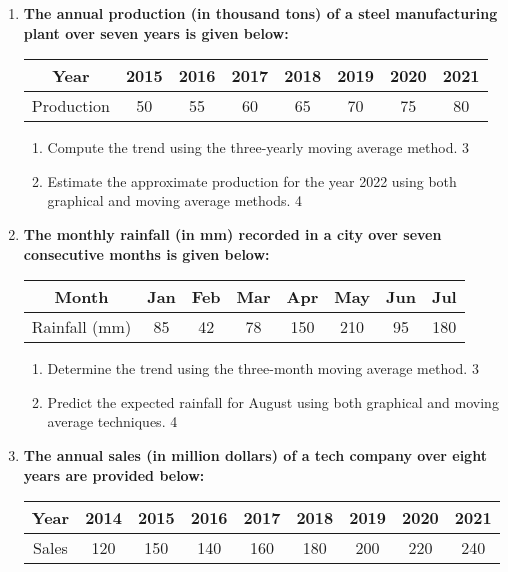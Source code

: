 \documentclass[a4paper,oneside]{book}
\begin{document}
\begin{enumerate}
  \item
\textbf{The annual production (in thousand tons) of a steel manufacturing plant over seven years is given below:}

\begin{table}[h]
\centering
\begin{tabular}{cccccccc}
Year     & 2015 & 2016 & 2017 & 2018 & 2019 & 2020 & 2021 \\ \hline
Production & 50   & 55   & 60   & 65   & 70   & 75   & 80   
\end{tabular}
\end{table}

\begin{enumerate}
    \item  
    Compute the trend using the three-yearly moving average method. \hfill 3
    \item
    Estimate the approximate production for the year 2022 using both graphical and moving average methods. \hfill 4
\end{enumerate}

\item  
\textbf{The monthly rainfall (in mm) recorded in a city over seven consecutive months is given below:}  

\begin{table}[h]  
\centering  
\begin{tabular}{cccccccc}  
Month     & Jan  & Feb  & Mar  & Apr  & May  & Jun  & Jul  \\ \hline  
Rainfall (mm) & 85   & 42   & 78   & 150  & 210  & 95   & 180    
\end{tabular}  
\end{table}  

\begin{enumerate}  
    \item  
    Determine the trend using the three-month moving average method. \hfill 3  
    \item  
    Predict the expected rainfall for August using both graphical and moving average techniques. \hfill 4  
\end{enumerate}  


\item
\textbf{The annual sales (in million dollars) of a tech company over eight years are provided below:}

\begin{table}[h]
\centering
\begin{tabular}{ccccccccc}
Year     & 2014 & 2015 & 2016 & 2017 & 2018 & 2019 & 2020 & 2021 \\ \hline
Sales    & 120  & 150  & 140  & 160  & 180  & 200  & 220  & 240   
\end{tabular}
\end{table}


\end{enumerate}
\end{document}
